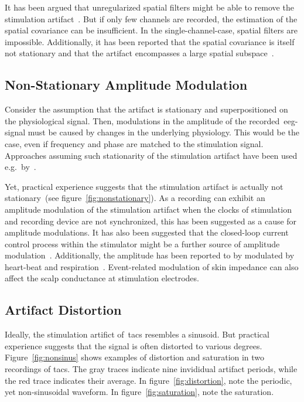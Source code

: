 \documentclass[a4paper]{article}
\newcommand{\figref}[1]{(see figure~\ref{#1})}
\begin{document}
It has been argued that unregularized spatial filters might be able to remove the stimulation artifact~\citep{Neuling_2017}. But if only few channels are recorded, the estimation of the spatial covariance can be insufficient. In the single-channel-case, spatial filters are impossible.
Additionally, it has been reported that the spatial covariance is itself not stationary and that the artifact encompasses a large spatial subspace~\citep{Noury_2016}.

\subsection{Non-Stationary Amplitude Modulation}

Consider the assumption that the artifact is stationary and superpositioned on the physiological signal.
Then, modulations in the amplitude of the recorded~\gls{eeg}-signal must be caused by changes in the underlying physiology.
This would be the case, even if frequency and phase are matched to the stimulation signal. Approaches assuming such stationarity of the stimulation artifact have been used e.g.\ by~\cite{Pogosyan_2009}.

Yet, practical experience suggests that the stimulation artifact is actually not stationary~\figref{fig:nonstationary}.
As a recording can exhibit an amplitude modulation of the stimulation artifact when the clocks of stimulation and recording device are not synchronized, this has been suggested as a cause for amplitude modulations.
It has also been suggested that the closed-loop current control process within the stimulator might be a further source of amplitude modulation~\citep{Neuling_2017}.
Additionally, the amplitude has been reported to by modulated by heart-beat and respiration~\citep{Noury_2016}. Event-related modulation of skin impedance can also affect the scalp conductance at stimulation electrodes.

\subsection{Artifact Distortion}

Ideally, the stimulation artifict of~\gls{tacs} resembles a sinusoid. But practical experience suggests that the signal is often distorted to various degrees.
Figure~\ref{fig:nonsinus} shows examples of distortion and saturation in two recordings of \gls{tacs}. The gray traces indicate nine invididual artifact periods, while the red trace indicates their average. In figure~\ref{fig:distortion}, note the periodic, yet non-sinusoidal waveform. In figure~\ref{fig:saturation}, note the saturation.
\end{document}
